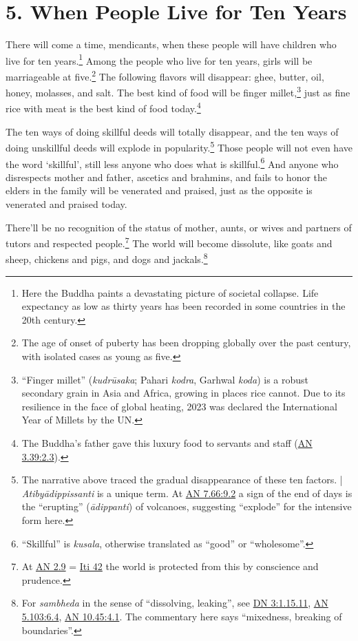 \documentclass[12pt,openany]{book}%
\begin{document}
\section*{5. When People Live for Ten Years }

There will come a time, mendicants, when these people will have children who live for ten years.\footnote{Here the Buddha paints a devastating picture of societal collapse. Life expectancy as low as thirty years has been recorded in some countries in the 20th century. } Among the people who live for ten years, girls will be marriageable at five.\footnote{The age of onset of puberty has been dropping globally over the past century, with isolated cases as young as five. } The following flavors will disappear: ghee, butter, oil, honey, molasses, and salt. The best kind of food will be finger millet,\footnote{“Finger millet” (\textit{\textsanskrit{kudrūsaka}}; Pahari \textit{kodra}, Garhwal \textit{koda}) is a robust secondary grain in Asia and Africa, growing in places rice cannot. Due to its resilience in the face of global heating, 2023 was declared the International Year of Millets by the UN. } just as fine rice with meat is the best kind of food today.\footnote{The Buddha’s father gave this luxury food to servants and staff (\href{https://suttacentral.net/an3.39/en/sujato\#2.3}{AN 3.39:2.3}). } 

The ten ways of doing skillful deeds will totally disappear, and the ten ways of doing unskillful deeds will explode in popularity.\footnote{The narrative above traced the gradual disappearance of these ten factors. | \textit{\textsanskrit{Atibyādippissanti}} is a unique term. At \href{https://suttacentral.net/an7.66/en/sujato\#9.2}{AN 7.66:9.2} a sign of the end of days is the “erupting” (\textit{\textsanskrit{ādippanti}}) of volcanoes, suggesting “explode” for the intensive form here. } Those people will not even have the word ‘skillful’, still less anyone who does what is skillful.\footnote{“Skillful” is \textit{kusala}, otherwise translated as “good” or “wholesome”. } And anyone who disrespects mother and father, ascetics and brahmins, and fails to honor the elders in the family will be venerated and praised, just as the opposite is venerated and praised today. 

There’ll be no recognition of the status of mother, aunts, or wives and partners of tutors and respected people.\footnote{At \href{https://suttacentral.net/an2.9/en/sujato}{AN 2.9} = \href{https://suttacentral.net/iti42/en/sujato}{Iti 42} the world is protected from this by conscience and prudence. } The world will become dissolute, like goats and sheep, chickens and pigs, and dogs and jackals.\footnote{For \textit{sambheda} in the sense of “dissolving, leaking”, see \href{https://suttacentral.net/dn3/en/sujato\#1.15.11}{DN 3:1.15.11}, \href{https://suttacentral.net/an5.103/en/sujato\#6.4}{AN 5.103:6.4}, \href{https://suttacentral.net/an10.45/en/sujato\#4.1}{AN 10.45:4.1}. The commentary here says “mixedness, breaking of boundaries”. } 
\end{document}
